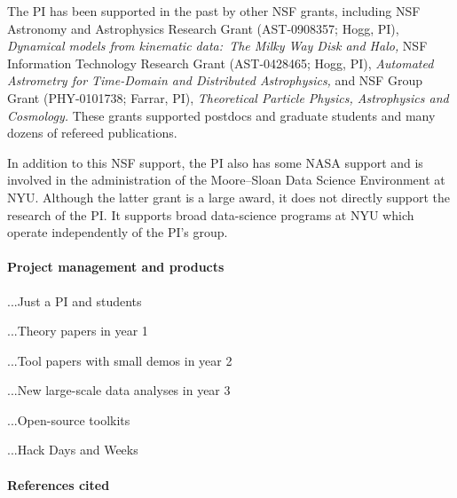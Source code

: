 \documentclass[12pt]{article}
\begin{document}
The PI has been supported in the past by other NSF grants, including
NSF Astronomy and Astrophysics Research Grant (AST-0908357; Hogg, PI),
\textit{Dynamical models from kinematic data:\ The Milky Way Disk and Halo,}
NSF Information Technology Research Grant (AST-0428465; Hogg, PI),
\textit{Automated Astrometry for Time-Domain and Distributed
Astrophysics,} and
NSF Group Grant (PHY-0101738; Farrar, PI), \textit{Theoretical
Particle Physics, Astrophysics and Cosmology.}
These grants supported postdocs and graduate students and many dozens
of refereed publications.

In addition to this NSF support, the PI also has some NASA support and
is involved in the administration of the Moore--Sloan Data Science
Environment at NYU.
Although the latter grant is a large award, it does not directly
support the research of the PI.
It supports broad data-science programs at NYU which operate
independently of the PI's group.

\paragraph{Project management and products}

...Just a PI and students

...Theory papers in year 1

...Tool papers with small demos in year 2

...New large-scale data analyses in year 3

...Open-source toolkits

...Hack Days and Weeks

\paragraph{References cited}

\clearpage
\end{document}
